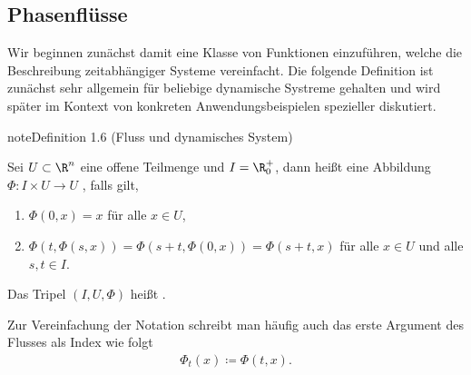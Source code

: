 \documentclass[letterpaper,10pt,english]{jupyterBook}
\begin{document}
\subsection{Phasenflüsse}
\label{\detokenize{ode/fluesse:phasenflusse}}
\sphinxAtStartPar
Wir beginnen zunächst damit eine Klasse von Funktionen einzuführen, welche die Beschreibung zeitabhängiger Systeme vereinfacht.
Die folgende Definition ist zunächst sehr allgemein für beliebige dynamische Systreme gehalten und wird später im Kontext von konkreten Anwendungsbeispielen spezieller diskutiert.
\label{ode/fluesse:def:Fluss}
\begin{sphinxadmonition}{note}{Definition 1.6 (Fluss und dynamisches System)}



\sphinxAtStartPar
Sei \(U \subset \R^n\) eine offene Teilmenge und \(I=\R^+_0\), dann heißt eine Abbildung \(\Phi:I\times U\rightarrow U\) , falls gilt,
\begin{enumerate}
%
\item {} 
\sphinxAtStartPar
\(\Phi(0, x) = x\) für alle \(x\in U\),

\item {} 
\sphinxAtStartPar
\(\Phi(t, \Phi(s,x)) = \Phi(s + t, \Phi(0, x)) = \Phi(s + t, x)\) für alle \(x\in U\) und alle \(s,t\in I\).

\end{enumerate}

\sphinxAtStartPar
Das Tripel \((I, U, \Phi)\) heißt .

\sphinxAtStartPar
Zur Vereinfachung der Notation schreibt man häufig auch das erste Argument des Flusses als Index wie folgt
\begin{equation*}
\begin{split}\Phi_t(x) \coloneqq \Phi(t, x).\end{split}
\end{equation*}\end{sphinxadmonition}
\end{document}
